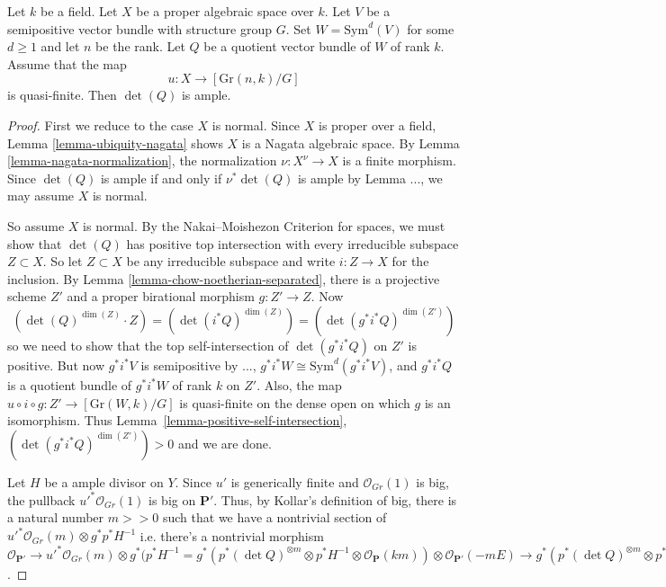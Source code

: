 \begin{lemma}
Let $k$ be a field.
Let $X$ be a proper algebraic space over $k$.
Let $V$ be a semipositive vector bundle with structure group $G$.
Set $W = \mathrm{Sym}^d(V)$ for some $d \geq 1$ and let $n$ be the rank.
Let $Q$ be a quotient vector bundle of $W$ of rank $k$.
Assume that the map
$$
u : X \to [\mathrm{Gr}(n,k)/G]
$$
is quasi-finite.
Then $\det(Q)$ is ample.
\end{lemma}

\begin{proof}
First we reduce to the case $X$ is normal.
Since $X$ is proper over a field, Lemma \ref{lemma-ubiquity-nagata} shows $X$
is a Nagata algebraic space.
By Lemma \ref{lemma-nagata-normalization}, the normalization
$\nu : X^\nu \to X$ is a finite morphism.
Since $\det(Q)$ is ample if and only if $\nu^*\det(Q)$ is ample by
Lemma ..., we may
assume $X$ is normal.

So assume $X$ is normal.
By the Nakai--Moishezon Criterion for spaces,
we must show that $\det(Q)$ has positive top intersection with
every irreducible subspace $Z \subset X$.
So let $Z \subset X$ be any irreducible subspace and write $i : Z \to X$ for
the inclusion.
By Lemma \ref{lemma-chow-noetherian-separated}, there is a projective
scheme $Z'$ and a proper birational morphism $g : Z' \to Z$.
Now
$$
  (\det(Q)^{\dim(Z)} \cdot Z)
    = (\det(i^*Q)^{\dim(Z)})
    = (\det(g^*i^*Q)^{\dim(Z')})
$$
so we need to show that the top self-intersection of $\det(g^*i^*Q)$ on $Z'$
is positive.
But now $g^*i^*V$ is semipositive by ...,
$g^*i^*W \cong \mathrm{Sym}^d(g^*i^*V)$, and $g^*i^*Q$ is a
quotient bundle of $g^*i^*W$ of rank $k$ on $Z'$.
Also, the map $u \circ i \circ g : Z' \to [\mathrm{Gr}(W,k)/G]$ is quasi-finite
on the dense open on which $g$ is an isomorphism.
Thus Lemma~\ref{lemma-positive-self-intersection},
$(\det(g^*i^*Q)^{\dim(Z')}) > 0$ and we are done.
  
Let $H$ be a ample divisor on $Y$. Since $u'$ is generically finite and $\mathcal{O}_{Gr}(1)$ is big, the pullback $u'^*  \mathcal{O}_{Gr}(1)$ is big on $\mathbf{P}'$.  Thus, by Kollar's definition of big, there is a natural number $m>>0$ such that we have a nontrivial section of $u'^*\mathcal{O}_{Gr}(m)\otimes g^*p^*H^{-1}$ i.e. there's a nontrivial morphism $\mathcal{O}_{\mathbf{P}'}\to u'^*\mathcal{O}_{Gr}(m)\otimes g^*(p^*H^{-1}=g^*(p^*(\det Q)^{\otimes m}\otimes p^*H^{-1}\otimes \mathcal{O}_{\mathbf{P}}(km))\otimes \mathcal{O}_{\mathbf{P}'}(-mE)\to g^*(p^*(\det Q)^{\otimes m}\otimes p^*H^{-1}\otimes \mathcal{O}_{\mathbf{P}}(km))$. 


\end{proof}
